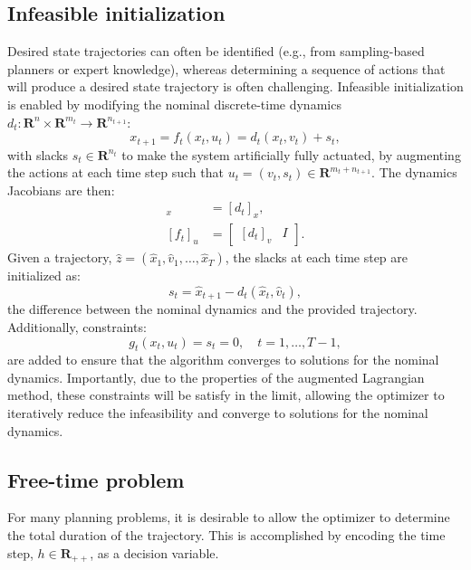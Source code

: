 \subsection{Infeasible initialization}
Desired state trajectories can often be identified (e.g., from sampling-based planners or expert knowledge), whereas determining a sequence of actions that will produce a desired state trajectory is often challenging. Infeasible initialization is enabled by modifying the nominal discrete-time dynamics $d_t : \mathbf{R}^{n} \times \mathbf{R}^{m_t} \rightarrow \mathbf{R}^{n_{t+1}}$:
\begin{equation}
	x_{t+1} = f_t(x_t,u_t) = d_t(x_t, v_t) + s_t \label{altro_slack_dynamics},
\end{equation}
with slacks $s_t \in \mathbf{R}^{n_t}$ to make the system artificially fully actuated, by augmenting the actions at each time step such that $u_t = (v_t, s_t) \in \mathbf{R}^{m_t + n_{t+1}}$. The dynamics Jacobians are then:
\begin{align}
	[f_t]_x &= [d_t]_x, \\
	[f_t]_u &= \begin{bmatrix} [d_t]_v & I \end{bmatrix}.
\end{align}
Given a trajectory, $\hat{z} = (\hat{x}_1, \hat{v}_1, \dots, \hat{x}_T)$, the slacks at each time step are initialized as:
\begin{equation}
	s_t = \hat{x}_{t+1} - d_t(\hat{x}_t, \hat{v}_t), \label{altro_slack_actions}
\end{equation}
the difference between the nominal dynamics and the provided trajectory. Additionally, constraints:
\begin{equation}
	g_t(x_t, u_t) = s_t = 0, \quad t = 1, \dots, T-1,
\end{equation}
are added to ensure that the algorithm converges to solutions for the nominal dynamics. Importantly, due to the properties of the augmented Lagrangian method, these constraints will be satisfy in the limit, allowing the optimizer to iteratively reduce the infeasibility and converge to solutions for the nominal dynamics.

\subsection{Free-time problem}
For many planning problems, it is desirable to allow the optimizer to determine the total duration of the trajectory. This is accomplished by encoding the time step, $h \in \mathbf{R}_{++}$, as a decision variable.

